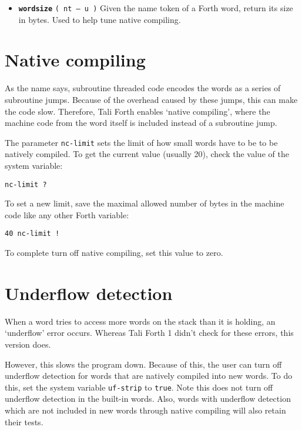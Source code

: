 \begin{itemize}
        \item \textbf{\texttt{wordsize}}
                \texttt{( nt -- u )} Given the name token  of
                a Forth word, return its size in bytes. Used to help tune 
                native compiling.

\end{itemize}


\section{Native compiling}

As the name says, subroutine threaded code encodes the words as
a series of subroutine jumps. Because of the overhead caused by these jumps,
this can make the code slow. Therefore, Tali Forth enables `native compiling',
where the machine code from the word itself is included instead of a subroutine
jump. 

The parameter \texttt{nc-limit} sets the limit
of how small words have to be to be natively compiled. To get the current value
(usually 20), check the value of the system variable: 

\begin{lstlisting}[frame=lines]
        nc-limit ?
\end{lstlisting}

\noindent To set a new limit, save the maximal allowed number of bytes in the
machine code like any other Forth variable:

\begin{lstlisting}[frame=lines]
        40 nc-limit !
\end{lstlisting}

To complete turn off native compiling, set this value to zero.


\section{Underflow detection}

When a word tries to access more words on the stack than it is holding, an
`underflow' error occurs. Whereas Tali Forth 1 didn't check
for these errors, this version does. 

However, this slows the program down. Because of this, the user can turn off
underflow detection for words that are natively compiled into new words. To do
this, set the system variable
\texttt{uf-strip} to
\texttt{true}. Note this does not turn off underflow
detection in the built-in words. Also, words with underflow detection which are
not included in new words through native compiling will also retain their tests.


